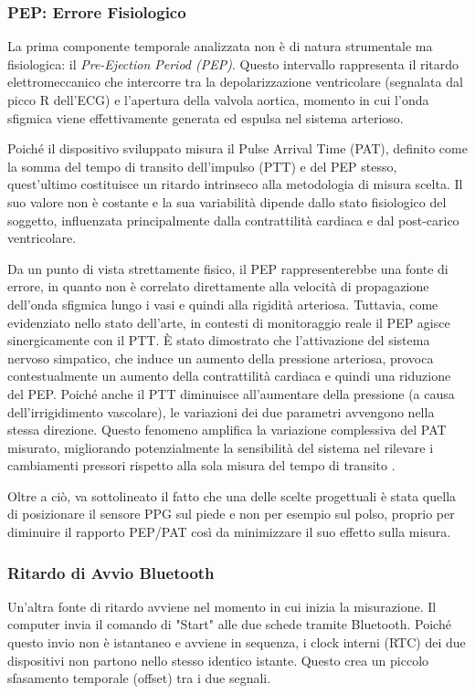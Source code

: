 \documentclass[11pt,a4paper]{article}
\begin{document}
\subsubsection{PEP: Errore Fisiologico}
La prima componente temporale analizzata non è di natura strumentale ma fisiologica: il \textit{Pre-Ejection Period (PEP)}. Questo intervallo rappresenta il ritardo elettromeccanico che intercorre tra la depolarizzazione ventricolare (segnalata dal picco R dell'ECG) e l'apertura della valvola aortica, momento in cui l'onda sfigmica viene effettivamente generata ed espulsa nel sistema arterioso.

Poiché il dispositivo sviluppato misura il Pulse Arrival Time (PAT), definito come la somma del tempo di transito dell'impulso (PTT) e del PEP stesso, quest'ultimo costituisce un ritardo intrinseco alla metodologia di misura scelta. Il suo valore non è costante e la sua variabilità dipende dallo stato fisiologico del soggetto, influenzata principalmente dalla contrattilità cardiaca e dal post-carico ventricolare.

Da un punto di vista strettamente fisico, il PEP rappresenterebbe una fonte di errore, in quanto non è correlato direttamente alla velocità di propagazione dell'onda sfigmica lungo i vasi e quindi alla rigidità arteriosa. Tuttavia, come evidenziato nello stato dell'arte, in contesti di monitoraggio reale il PEP agisce sinergicamente con il PTT. È stato dimostrato che l'attivazione del sistema nervoso simpatico, che induce un aumento della pressione arteriosa, provoca contestualmente un aumento della contrattilità cardiaca e quindi una riduzione del PEP. Poiché anche il PTT diminuisce all'aumentare della pressione (a causa dell'irrigidimento vascolare), le variazioni dei due parametri avvengono nella stessa direzione. Questo fenomeno amplifica la variazione complessiva del PAT misurato, migliorando potenzialmente la sensibilità del sistema nel rilevare i cambiamenti pressori rispetto alla sola misura del tempo di transito \cite{Xie_Effects}.

Oltre a ciò, va sottolineato il fatto che una delle scelte progettuali è stata quella di posizionare il sensore PPG sul piede e non per esempio sul polso, proprio per diminuire il rapporto PEP/PAT così da minimizzare il suo effetto sulla misura.


\subsubsection{Ritardo di Avvio Bluetooth}
Un'altra fonte di ritardo avviene nel momento in cui inizia la misurazione. Il computer invia il comando di "Start" alle due schede tramite Bluetooth. Poiché questo invio non è istantaneo e avviene in sequenza, i clock interni (RTC) dei due dispositivi non partono nello stesso identico istante. Questo crea un piccolo sfasamento temporale (offset) tra i due segnali.
\end{document}
